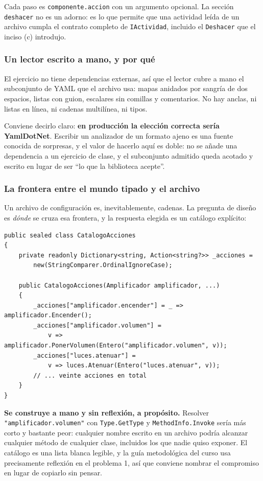 Cada paso es \texttt{componente.accion} con un argumento opcional. La sección
\texttt{deshacer} no es un adorno: es lo que permite que una actividad leída de un archivo
cumpla el contrato completo de \texttt{IActividad}, incluido el \texttt{Deshacer} que el
inciso (c) introdujo.

\subsubsection*{Un lector escrito a mano, y por qué}

El ejercicio no tiene dependencias externas, así que el lector cubre a mano el subconjunto de
YAML que el archivo usa: mapas anidados por sangría de dos espacios, listas con guion,
escalares sin comillas y comentarios. No hay anclas, ni listas en línea, ni cadenas
multilínea, ni tipos.

Conviene decirlo claro: \textbf{en producción la elección correcta sería YamlDotNet}. Escribir
un analizador de un formato ajeno es una fuente conocida de sorpresas, y el valor de hacerlo
aquí es doble: no se añade una dependencia a un ejercicio de clase, y el subconjunto admitido
queda acotado y escrito en lugar de ser ``lo que la biblioteca acepte''.

\subsubsection*{La frontera entre el mundo tipado y el archivo}

Un archivo de configuración es, inevitablemente, cadenas. La pregunta de diseño es
\emph{dónde} se cruza esa frontera, y la respuesta elegida es un catálogo explícito:

{\small
\begin{verbatim}
public sealed class CatalogoAcciones
{
    private readonly Dictionary<string, Action<string?>> _acciones =
        new(StringComparer.OrdinalIgnoreCase);

    public CatalogoAcciones(Amplificador amplificador, ...)
    {
        _acciones["amplificador.encender"] = _ => amplificador.Encender();
        _acciones["amplificador.volumen"] =
            v => amplificador.PonerVolumen(Entero("amplificador.volumen", v));
        _acciones["luces.atenuar"] =
            v => luces.Atenuar(Entero("luces.atenuar", v));
        // ... veinte acciones en total
    }
}
\end{verbatim}
}

\textbf{Se construye a mano y sin reflexión, a propósito.} Resolver
\texttt{"amplificador.volumen"} con \texttt{Type.GetType} y \texttt{MethodInfo.Invoke} sería
más corto y bastante peor: cualquier nombre escrito en un archivo podría alcanzar cualquier
método de cualquier clase, incluidos los que nadie quiso exponer. El catálogo es una lista
blanca legible, y la guía metodológica del curso usa precisamente reflexión en el problema 1,
así que conviene nombrar el compromiso en lugar de copiarlo sin pensar.

